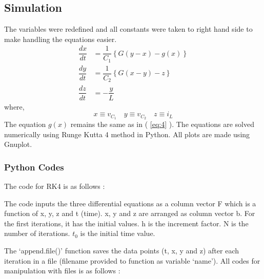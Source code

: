 \documentclass[12pt]{article}
\newcommand*{\myref}[1]{%
  \begingroup
    \hypersetup{
      linkcolor=linkequation,
      linkbordercolor=linkequation,
    }%
    \ref{#1}%
  \endgroup
}
\begin{document}
\subsection{Simulation}
The variables were redefined and all constants were taken to right hand side to make handling the equations easier.
\begin{align}
	\dfrac{dx}{dt}&=\dfrac{1}{C_1}\left\{ G\left( y-x \right)-g(x) \right\} \label{eq:5} \\
	\dfrac{dy}{dt}&=\dfrac{1}{C_2}\left\{ G\left( x-y \right)-z \right\} \label{eq:6} \\
	\dfrac{dz}{dt}&=-\dfrac{y}{L} \label{eq:7}
\end{align}
where,
\[ x \equiv v_{C_1} \quad y \equiv v_{C_2} \quad z \equiv i_L \]
The equation $g(x)$ remains the same as in (\myref{eq:4}).\linebreak
The equations are solved numerically using Runge Kutta 4 method in Python. All plots are made using Gnuplot.
%
\subsubsection{Python Codes}
The code for RK4 is as follows :

The code inputs the three differential equations as a column vector F which is a function of x, y, z and t (time). x, y and z are arranged as column vector b. For the first iterations, it has the initial values. 
h is the increment factor. N is the number of iterations. $t_0$ is the initial time value. \linebreak

The `append.file()' function saves the data points (t, x, y and z) after each iteration in a file (filename provided to function as variable `name'). All codes for manipulation with files is as follows :

%
\end{document}
